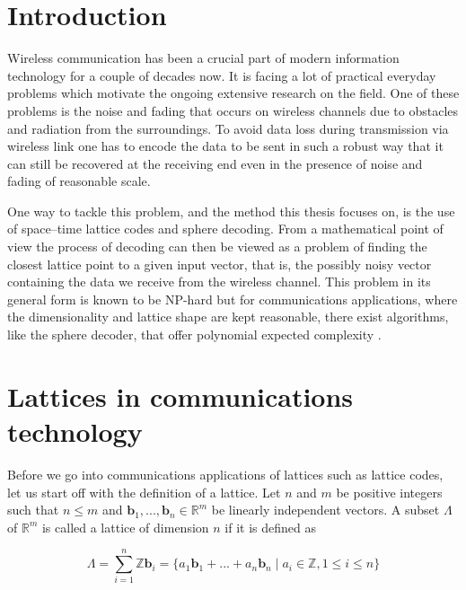 \documentclass[english,12pt,a4paper,pdftex,sci,utf8]{aaltothesis}
\begin{document}
\section{Introduction}
Wireless communication has been a crucial part of modern information technology for a couple of decades now. It is facing a lot of practical everyday problems which motivate the ongoing extensive research on the field. One of these problems is the noise and fading that occurs on wireless channels due to obstacles and radiation from the surroundings. To avoid data loss during transmission via wireless link one has to encode the data to be sent in such a robust way that it can still be recovered at the receiving end even in the presence of noise and fading of reasonable scale. 
\par One way to tackle this problem, and the method this thesis focuses on, is the use of space--time lattice codes and sphere decoding. From a mathematical point of view the process of decoding can then be viewed as a problem of finding the closest lattice point to a given input vector, that is, the possibly noisy vector containing the data we receive from the wireless channel. This problem in its general form is known to be NP-hard but for communications applications, where the dimensionality and lattice shape are kept reasonable, there exist algorithms, like the sphere decoder, that offer polynomial expected complexity \cite{mia}.


\clearpage

\section{Lattices in communications technology}

Before we go into communications applications of lattices such as lattice codes, let us start off with the definition of a lattice. Let $n$ and $m$ be positive integers such that $n \leq m$ and $\mathbf{b}_1, ... , \mathbf{b}_n \in \mathbb{R}^m$ be linearly independent vectors. A subset $\Lambda$ of $\mathbb{R}^m$ is called a lattice of dimension $n$ if it is defined as

\begin{equation}
\Lambda = \sum_{i=1}^{n} \mathbb{Z}\mathbf{b}_i = \{a_1\mathbf{b}_1 + ...+a_n\mathbf{b}_n \mid a_i \in \mathbb{Z}, 1 \leq i \leq n\}\label{eq:lattice}
\end{equation}
\end{document}

